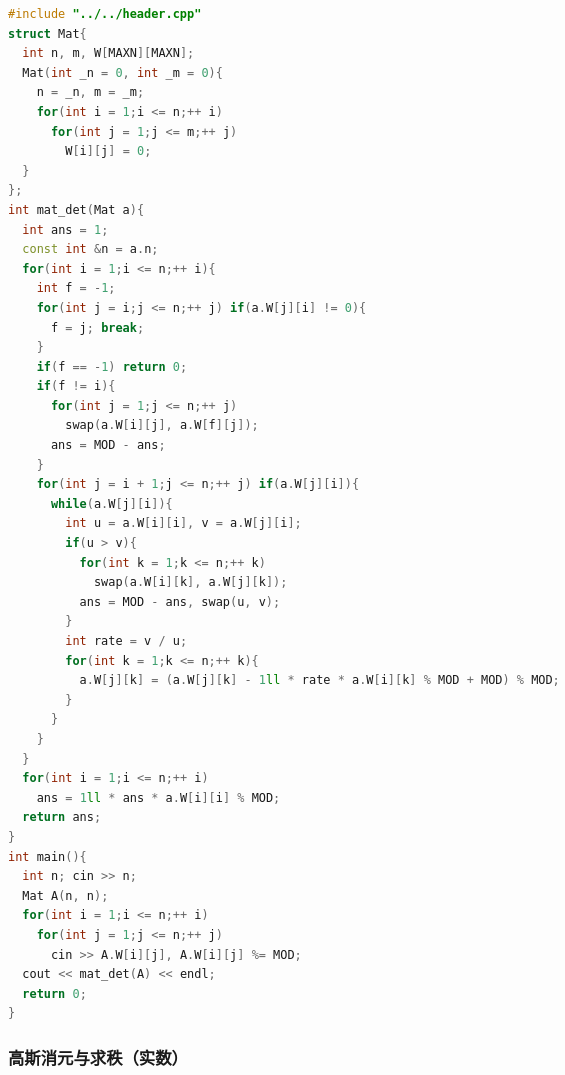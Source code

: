 \documentclass[10pt]{ctexart}
\begin{document}
\begin{multicols}{3}
\begin{lstlisting}[language={C++}]
#include "../../header.cpp"
struct Mat{
  int n, m, W[MAXN][MAXN];
  Mat(int _n = 0, int _m = 0){
    n = _n, m = _m;
    for(int i = 1;i <= n;++ i)
      for(int j = 1;j <= m;++ j)
        W[i][j] = 0;
  }
};
int mat_det(Mat a){
  int ans = 1;
  const int &n = a.n;
  for(int i = 1;i <= n;++ i){
    int f = -1;
    for(int j = i;j <= n;++ j) if(a.W[j][i] != 0){
      f = j; break;
    }
    if(f == -1) return 0;
    if(f != i){
      for(int j = 1;j <= n;++ j)
        swap(a.W[i][j], a.W[f][j]);
      ans = MOD - ans;
    }
    for(int j = i + 1;j <= n;++ j) if(a.W[j][i]){
      while(a.W[j][i]){
        int u = a.W[i][i], v = a.W[j][i];
        if(u > v){
          for(int k = 1;k <= n;++ k)
            swap(a.W[i][k], a.W[j][k]);
          ans = MOD - ans, swap(u, v);
        }
        int rate = v / u;
        for(int k = 1;k <= n;++ k){
          a.W[j][k] = (a.W[j][k] - 1ll * rate * a.W[i][k] % MOD + MOD) % MOD;
        }
      }
    }
  }
  for(int i = 1;i <= n;++ i)
    ans = 1ll * ans * a.W[i][i] % MOD;
  return ans;
}
int main(){
  int n; cin >> n;
  Mat A(n, n);
  for(int i = 1;i <= n;++ i)
    for(int j = 1;j <= n;++ j)
      cin >> A.W[i][j], A.W[i][j] %= MOD;
  cout << mat_det(A) << endl;
  return 0;
}
\end{lstlisting}

    \subsubsection{高斯消元与求秩（实数）}\label{ux9ad8ux65afux6d88ux5143ux4e0eux6c42ux79e9ux5b9eux6570}


\end{multicols}
\end{document}

